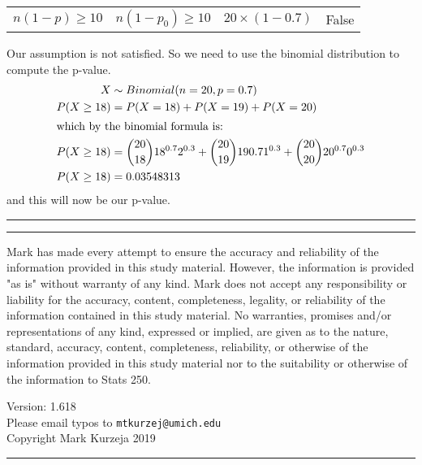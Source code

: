 \documentclass[landscape]{article}
\newcommand{\myline}{\vspace{4pt}\hrule  \vspace{4pt}}
\newenvironment{topic}[1]{
	\noindent \textbf{\textsc{\color{harvardcrimson}{#1}}}
	\noindent \hspace{-3.5pt}
}{
	\myline
}
\newenvironment{compactitem}{
	\begin{itemize}[leftmargin=*,labelsep=5pt]
	}{
	\end{itemize}
}
\begin{document}
\begin{multicols*}{3}
\begin{topic}{One Proportion Test Assumptions}
\begin{compactitem}
\begin{center}
\begin{tabular}{cccc}
					$ n(1-p) \geq 10 $    &    $ n(1-p_0) \geq 10 $   &     $ 20 \times (1-0.7) $   & False
				\end{tabular}
			\end{center}
			Our assumption is not satisfied. So we need to use the binomial distribution to compute the p-value. 
			\begin{align*}
				X &\sim Binomial(n = 20, p = 0.7)\\
				P(X \geq 18) &= P(X = 18) + P(X = 19) + P(X = 20)\\
				\intertext{which by the binomial formula is:}
				P(X \geq 18) &= \binom{20}{18} 18^{0.7} 2^{0.3} + \binom{20}{19} 19{0.7} 1^{0.3} + \binom{20}{20} 20^{0.7} 0^{0.3}\\
				P(X \geq 18) &= 0.03548313
			\end{align*}
			and this will now be our p-value.
		\end{compactitem}
	\end{topic}
	
	\begin{topic}{}
		
	\end{topic}
	
	
	\begin{topic}{Disclaimer} \tiny
		Mark has made every attempt to ensure the accuracy and reliability of the information provided in this study material. However, the information is provided "as is" without warranty of any kind. Mark does not accept any responsibility or liability for the accuracy, content, completeness, legality, or reliability of the information contained in this study material.
		No warranties, promises and/or representations of any kind, expressed or implied, are given as to the nature, standard, accuracy, content, completeness, reliability, or otherwise of the information provided in this study material nor to the suitability or otherwise of the information to Stats 250. 
		\begin{center}
			Version: 1.618\\
			Please email typos to \texttt{mtkurzej@umich.edu}\\
			Copyright Mark Kurzeja 2019				
		\end{center}
	
	
	\end{topic}

		

\end{multicols*}
\end{document}
